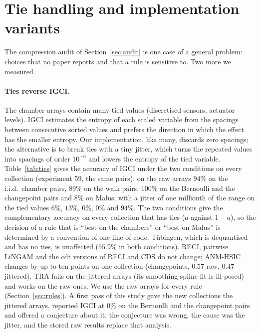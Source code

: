 \section{Tie handling and implementation variants}\label{sec:ties}

The compression audit of Section~\ref{sec:audit} is one case of a general problem: choices that no paper reports and that a rule is sensitive to. Two more we measured.

\paragraph{Ties reverse IGCI.} The chamber arrays contain many tied values (discretised sensors, actuator levels). IGCI estimates the entropy of each scaled variable from the spacings between consecutive sorted values and prefers the direction in which the effect has the smaller entropy. Our implementation, like many, discards zero spacings; the alternative is to break ties with a tiny jitter, which turns the repeated values into spacings of order $10^{-6}$ and lowers the entropy of the tied variable. Table~\ref{tab:ties} gives the accuracy of IGCI under the two conditions on every collection (experiment 59, the same pairs): on the raw arrays $94\%$ on the i.i.d.\ chamber pairs, $89\%$ on the walk pairs, $100\%$ on the Bernoulli and the changepoint pairs and $8\%$ on Malus; with a jitter of one millionth of the range on the tied values $6\%$, $13\%$, $0\%$, $0\%$ and $94\%$. The two conditions give the complementary accuracy on every collection that has ties ($a$ against $1-a$), so the decision of a rule that is ``best on the chambers'' or ``best on Malus'' is determined by a convention of one line of code. T\"ubingen, which is dequantised and has no ties, is unaffected ($55.9\%$ in both conditions). RECI, pairwise LiNGAM and the cdt versions of RECI and CDS do not change; ANM-HSIC changes by up to ten points on one collection (changepoints, $0.57$ raw, $0.47$ jittered). TRA fails on the jittered arrays (its smoothing-spline fit is ill-posed) and works on the raw ones. We use the raw arrays for every rule (Section~\ref{sec:rules}). A first pass of this study gave the new collections the jittered arrays, reported IGCI at $0\%$ on the Bernoulli and the changepoint pairs and offered a conjecture about it; the conjecture was wrong, the cause was the jitter, and the stored raw results replace that analysis.

